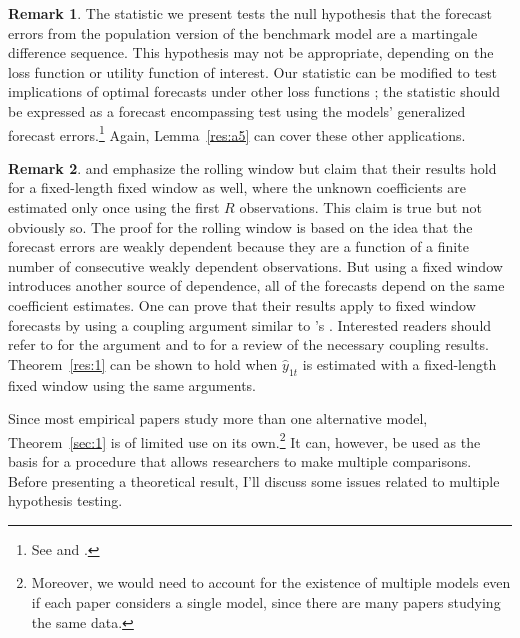 \documentclass[11pt,fleqn]{article}
\newcommand\citepos[2][]{\citeauthor{#2}'s \citeyearpar[#1]{#2}}
\theoremstyle{definition}
\newtheorem{rem}{Remark}
\begin{document}
\begin{rem}
  The statistic we present tests the null hypothesis that the forecast
  errors from the population version of the benchmark model are a
  martingale difference sequence.  This hypothesis may not be
  appropriate, depending on the loss function or utility function of
  interest.  Our statistic can be modified to test implications of
  optimal forecasts under other loss functions
  \citep[see][]{PaT:07,PaT:07b}; the statistic should be expressed as
  a forecast encompassing test using the models' generalized forecast
  errors.\footnote{See \citet{HLN:98} and \citet[Section~4]{ClW:07}.}
  Again, Lemma~\ref{res:a5} can cover these other applications.
\end{rem}

\begin{rem}
  \citet{GiW:06} and \citet{ClW:06,ClW:07} emphasize the rolling
  window but claim that their results hold for a fixed-length fixed
  window as well, where the unknown coefficients are estimated only
  once using the first $R$ observations.  This claim is true but not
  obviously so.  The proof for the rolling window is based on the idea
  that the forecast errors are weakly dependent because they are a
  function of a finite number of consecutive weakly dependent
  observations.  But using a fixed window introduces another source of
  dependence, all of the forecasts depend on the same coefficient
  estimates.  One can prove that their results apply to fixed window
  forecasts by using a coupling argument similar to \citepos{Cal:11}.
  Interested readers should refer to \citet{Cal:11} for the argument
  and to \citet{MeP:02} for a review of the necessary coupling
  results.  Theorem~\ref{res:1} can be shown to hold when $\hat
  y_{1t}$ is estimated with a fixed-length fixed window using the same
  arguments.
\end{rem}

Since most empirical papers study more than one alternative model,
Theorem~\ref{sec:1} is of limited use on its own.\footnote{Moreover,
  we would need to account for the existence of multiple models even if
each paper considers a single model, since there are many papers
studying the same data.}  It can, however, be
used as the basis for a procedure that allows researchers to make
multiple comparisons.  Before presenting a theoretical result, I'll
discuss some issues related to multiple hypothesis testing.
\end{document}
